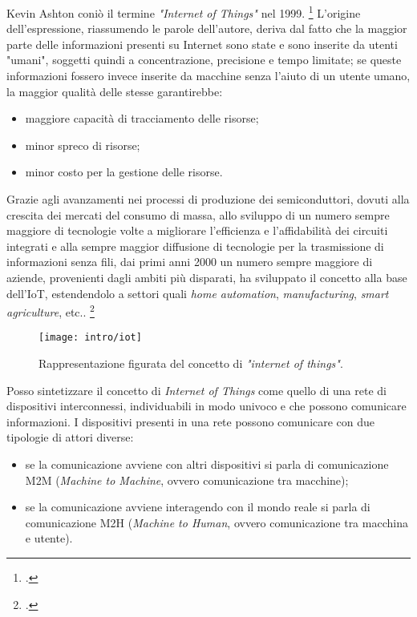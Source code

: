 Kevin Ashton coniò il termine \textit{"Internet of Things"} nel 1999.
\footcite{site:iot-kashton}
L'origine dell'espressione, riassumendo le parole dell'autore, deriva dal fatto che la maggior parte delle informazioni presenti su Internet sono state e sono inserite da utenti "umani", soggetti quindi a concentrazione, precisione e tempo limitate;
se queste informazioni fossero invece inserite da macchine senza l'aiuto di un utente umano, la maggior qualità delle stesse garantirebbe:
\begin{itemize}
  \item maggiore capacità di tracciamento delle risorse;
  \item minor spreco di risorse;
  \item minor costo per la gestione delle risorse.
\end{itemize}

Grazie agli avanzamenti nei processi di produzione dei semiconduttori, dovuti alla crescita dei mercati del consumo di massa, allo sviluppo di un numero sempre maggiore di tecnologie volte a migliorare l'efficienza e l'affidabilità dei circuiti integrati e alla sempre maggior diffusione di tecnologie per la trasmissione di informazioni senza fili, dai primi anni 2000 un numero sempre maggiore di aziende, provenienti dagli ambiti più disparati, ha sviluppato il concetto alla base dell'IoT, estendendolo a settori quali \textit{home automation}, \textit{manufacturing}, \textit{smart agriculture}, etc..
\footcite{site:pc-to-things}

\begin{figure}[H]
    \centering
    \texttt{[image: intro/iot]}
    \caption{Rappresentazione figurata del concetto di \textit{"internet of things"}.}
    \label{fig:iot}
\end{figure}

Posso sintetizzare il concetto di \emph{Internet of Things} come quello di una rete di dispositivi interconnessi, individuabili in modo univoco e che possono comunicare informazioni.
I dispositivi presenti in una rete possono comunicare con due tipologie di attori diverse:
\begin{itemize}
  \item se la comunicazione avviene con altri dispositivi si parla di comunicazione M2M (\textit{Machine to Machine}, ovvero comunicazione tra macchine);
  \item se la comunicazione avviene interagendo con il mondo reale si parla di comunicazione M2H (\textit{Machine to Human}, ovvero comunicazione tra macchina e utente).
\end{itemize}

